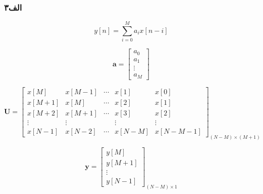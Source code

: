 \documentclass[12pt,onecolumn,a4paper]{article}
\begin{document}
	
	\subsubsection{الف۳}
	
	\begin{equation}
		y[n] = \sum_{i=0}^M a_i x[n-i]
	\end{equation}
	
	
	\begin{equation}
		\bm{a} = \begin{bmatrix}  a_0 \\ a_1 \\ \vdots \\ a_M \end{bmatrix}
	\end{equation}
	
	
	\begin{equation}
		\bm{U} = 
		\begin{bmatrix}
			x[M] & x[M-1] & \cdots & x[1] & x[0] \\
			x[M+1] & x[M] & \cdots & x[2] & x[1] \\
			x[M+2] & x[M+1] & \cdots & x[3] & x[2] \\
			\vdots & \vdots &  & \vdots & \vdots \\
			x[N-1] & x[N-2] & \cdots & x[N-M] & x[N-M-1]
		\end{bmatrix}_{(N-M)\times(M+1)}
	\end{equation}
	
	\begin{equation}
		\bm{y} = 
		\begin{bmatrix}
			y[M] \\
			y[M+1] \\
			\vdots \\
			y[N-1]
		\end{bmatrix}_{(N-M)\times1}
	\end{equation}
	
	
	
\end{document}
